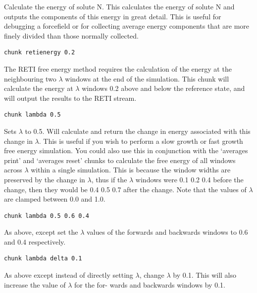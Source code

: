 \documentclass[letterpaper,10pt,english]{sphinxmanual}
\begin{document}
Calculate the energy of solute N. This calculates the energy of solute N and outputs the components of this energy in great detail. This is useful for debugging a forcefield or for collecting average energy components that are more finely divided than those normally collected.

\begin{Verbatim}[frame=single,commandchars=\\\{\}]
chunk retienergy 0.2
\end{Verbatim}

The RETI free energy method requires the calculation of the energy at the neighbouring two \(\lambda\) windows at the end of the simulation. This chunk will calculate the energy at \(\lambda\) windows 0.2 above and below the reference state, and will output the results to the RETI stream.

\begin{Verbatim}[frame=single,commandchars=\\\{\}]
chunk lambda 0.5
\end{Verbatim}

Sets \(\lambda\) to 0.5. Will calculate and return the change in energy associated with this change in \(\lambda\). This is useful if you wish to perform a slow growth or fast growth free energy simulation. You could also use this in conjunction with the ‘averages print’ and ‘averages reset’ chunks to calculate the free energy of all windows across \(\lambda\) within a single simulation. This is because the window widths are preserved by the change in \(\lambda\), thus if the \(\lambda\) windows were 0.1 0.2 0.4 before the change, then they would be 0.4 0.5 0.7 after the change. Note that the values of \(\lambda\) are clamped between 0.0 and 1.0.

\begin{Verbatim}[frame=single,commandchars=\\\{\}]
chunk lambda 0.5 0.6 0.4
\end{Verbatim}

As above, except set the \(\lambda\) values of the forwards and backwards windows to 0.6 and 0.4 respectively.

\begin{Verbatim}[frame=single,commandchars=\\\{\}]
chunk lambda delta 0.1
\end{Verbatim}

As above except instead of directly setting \(\lambda\), change \(\lambda\) by 0.1. This will also increase the value of \(\lambda\) for the for- wards and backwards windows by 0.1.
\end{document}
